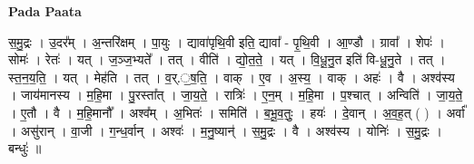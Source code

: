 \documentclass[17pt]{extarticle}
\begin{document}
\textbf{Pada Paata} \newline

स॒मु॒द्रः । उ॒दर᳚म् । अ॒न्तरि॑क्षम् । पा॒युः । द्यावा॑पृथि॒वी इति॒ द्यावा᳚ - पृ॒थि॒वी । आ॒ण्डौ । ग्रावा᳚ । शेपः॑ । सोमः॑ । रेतः॑ । यत् । ज॒ञ्ज॒भ्यते᳚ । तत् । वीति॑ । द्यो॒त॒ते॒ । यत् । वि॒धू॒नु॒त इति॑ वि-धू॒नु॒ते । तत् । स्त॒न॒य॒ति॒ । यत् । मेह॑ति । तत् । व॒र्.॒ष॒ति॒ । वाक् । ए॒व । अ॒स्य॒ । वाक् । अहः॑ । वै । अश्व॑स्य । जाय॑मानस्य । म॒हि॒मा । पु॒रस्ता᳚त् । जा॒य॒ते॒ । रात्रिः॑ । ए॒न॒म् । म॒हि॒मा । प॒श्चात् । अन्विति॑ । जा॒य॒ते॒ । ए॒तौ । वै । म॒हि॒मानौ᳚ । अश्व᳚म् । अ॒भितः॑ । समिति॑ । ब॒भू॒व॒तुः॒ । हयः॑ । दे॒वान् । अ॒व॒ह॒त् ( ) । अर्वा᳚ । असु॑रान् । वा॒जी । ग॒न्ध॒र्वान् । अश्वः॑ । म॒नु॒ष्यान्॑ । स॒मु॒द्रः । वै । अश्व॑स्य । योनिः॑ । स॒मु॒द्रः । बन्धुः॑ ॥  \newline
\end{document}
